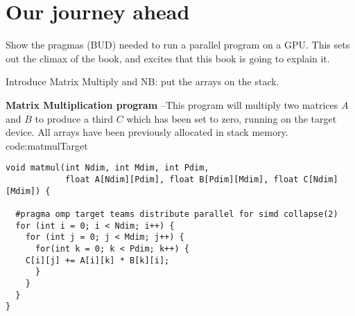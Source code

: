 \section{Our journey ahead}
\label{sec:OMPJouney}

Show the pragmas (BUD) needed to run a parallel program on a GPU.
This sets out the climax of the book, and excites that this book is going to explain it.


Introduce Matrix Multiply and
NB: put the arrays on the stack.


\begin{CodeExample}%
{\textbf{Matrix Multiplication program} --\small This program will multiply two matrices $A$ and $B$
to produce a third $C$ which has been set to zero, running on the target device.
All arrays have been previously allocated in stack memory.
}%
{code:matmulTarget}
\begin{lstlisting}
void matmul(int Ndim, int Mdim, int Pdim,
            float A[Ndim][Pdim], float B[Pdim][Mdim], float C[Ndim][Mdim]) {

  #pragma omp target teams distribute parallel for simd collapse(2)
  for (int i = 0; i < Ndim; i++) {
    for (int j = 0; j < Mdim; j++) {
      for(int k = 0; k < Pdim; k++) {
	C[i][j] += A[i][k] * B[k][i];
      }
    }
  }
}
\end{lstlisting}
\end{CodeExample}
